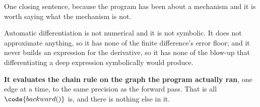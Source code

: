 \begin{fr}
One closing sentence, because the program has been about a mechanism and it is
worth saying what the mechanism is not.

Automatic differentiation is not numerical and it is not symbolic. It does not
approximate anything, so it has none of the finite difference's error floor;
and it never builds an expression for the derivative, so it has none of the
blow-up that differentiating a deep expression symbolically would produce.

\textbf{It evaluates the chain rule on the graph the program actually ran},
one edge at a time, to the same precision as the forward pass. That is all
$\code{backward()}$ is, and there is nothing else in it.
\end{fr}

